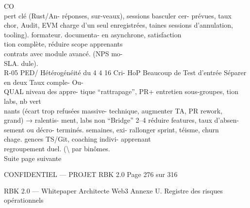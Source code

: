 CO\\
pert clé (Rust/An-                     réponses,     sur-veaux), sessions basculer    cer- prévues, taux\\
chor, Audit, EVM                       charge d’un seul enregistrées,     taines sessions d’annulation,\\
tooling).                              formateur.        documenta-       en asynchrone, satisfaction\\
tion   complète, réduire   scope apprenants\\
contrats    avec module avancé. (NPS        mo-\\
SLA.                              dule).\\
R-05   PED/     Hétérogénéité du 4 4 16 Cri- HoP       Beaucoup      de Test      d’entrée Séparer en deux Taux comple- Ou-\\
QUAL     niveau des appre-       tique          “rattrapage”, PR+         entretien sous-groupes,      tion labs, nb vert\\
nants (écart trop                      refusées massive- technique,         augmenter TA, PR        rework,\\
grand) → ralentis-                     ment, labs non “Bridge”        2–4 réduire features, taux d’absen-\\
sement ou décro-                       terminés.         semaines,     exi- rallonger sprint, téisme, churn\\
chage.                                                   gences TS/Git, coaching indivi- apprenant\\
regroupement duel.                  (\textbackslash{}%
par binômes.\\
Suite page suivante\\
\vspace{0.5em}
\vspace{0.5em}
\vspace{0.5em}
\vspace{0.5em}
\begin{confidential}CONFIDENTIEL — PROJET RBK 2.0                                                                                       Page 276 sur 316\end{confidential}
RBK 2.0 — Whitepaper Architecte Web3                                                                                                                 Annexe U. Registre des risques opérationnels\\
\vspace{0.5em}
